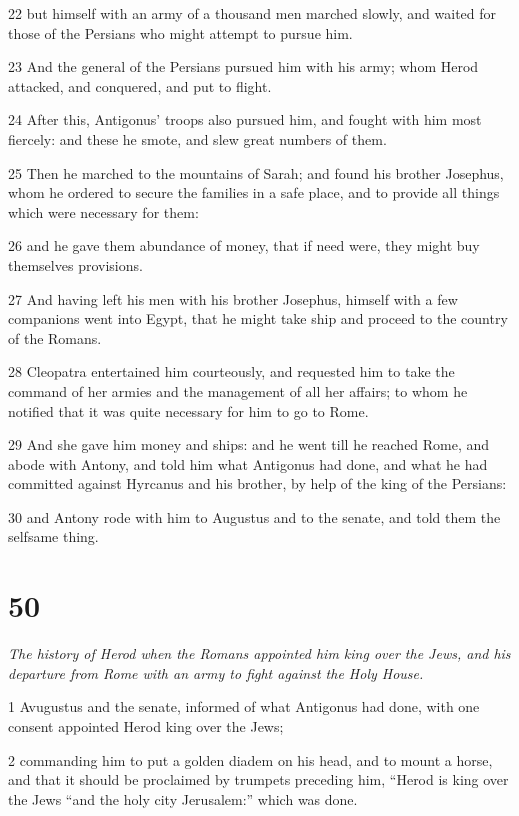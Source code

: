22 but himself with an army of a thousand men marched slowly, and waited for those of the Persians who might attempt to pursue him. 

23 And the general of the Persians pursued him with his army; whom Herod attacked, and conquered, and put to flight. 

24 After this, Antigonus’ troops also pursued him, and fought with him most fiercely: and these he smote, and slew great numbers of them. 

25 Then he marched to the mountains of Sarah; and found his brother Josephus, whom he ordered to secure the families in a safe place, and to provide all things which were necessary for them: 

26 and he gave them abundance of money, that if need were, they might buy themselves provisions. 

27 And having left his men with his brother Josephus, himself with a few companions went into Egypt, that he might take ship and proceed to the country of the Romans. 

28 Cleopatra entertained him courteously, and requested him to take the command of her armies and the management of all her affairs; to whom he notified that it was quite necessary for him to go to Rome. 

29 And she gave him money and ships: and he went till he reached Rome, and abode with Antony, and told him what Antigonus had done, and what he had committed against Hyrcanus and his brother, by help of the king of the Persians: 

30 and Antony rode with him to Augustus and to the senate, and told them the selfsame thing. 

\chapter{50}

\par \textit{The history of Herod when the Romans appointed him king over the Jews, and his departure from Rome with an army to fight against the Holy House.}

1 Avugustus and the senate, informed of what Antigonus had done, with one consent appointed Herod king over the Jews; 

2 commanding him to put a golden diadem on his head, and to mount a horse, and that it should be proclaimed by trumpets preceding him, “Herod is king over the Jews “and the holy city Jerusalem:” which was done. 

